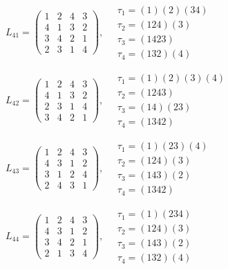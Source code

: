 $L_{41} = \begin{pmatrix} 1 & 2 & 4 & 3 \\ 4 & 1 & 3 & 2 \\ 3 & 4 & 2 & 1 \\ 2 & 3 & 1 & 4 \end{pmatrix}, \quad \begin{matrix} \tau_{1} = (1)(2)(3 4) \\ \tau_{2} = (1 2 4)(3) \\ \tau_{3} = (1 4 2 3) \\ \tau_{4} = (1 3 2)(4) \end{matrix}$

$L_{42} = \begin{pmatrix} 1 & 2 & 4 & 3 \\ 4 & 1 & 3 & 2 \\ 2 & 3 & 1 & 4 \\ 3 & 4 & 2 & 1 \end{pmatrix}, \quad \begin{matrix} \tau_{1} = (1)(2)(3)(4) \\ \tau_{2} = (1 2 4 3) \\ \tau_{3} = (1 4)(2 3) \\ \tau_{4} = (1 3 4 2) \end{matrix}$

$L_{43} = \begin{pmatrix} 1 & 2 & 4 & 3 \\ 4 & 3 & 1 & 2 \\ 3 & 1 & 2 & 4 \\ 2 & 4 & 3 & 1 \end{pmatrix}, \quad \begin{matrix} \tau_{1} = (1)(2 3)(4) \\ \tau_{2} = (1 2 4)(3) \\ \tau_{3} = (1 4 3)(2) \\ \tau_{4} = (1 3 4 2) \end{matrix}$

$L_{44} = \begin{pmatrix} 1 & 2 & 4 & 3 \\ 4 & 3 & 1 & 2 \\ 3 & 4 & 2 & 1 \\ 2 & 1 & 3 & 4 \end{pmatrix}, \quad \begin{matrix} \tau_{1} = (1)(2 3 4) \\ \tau_{2} = (1 2 4)(3) \\ \tau_{3} = (1 4 3)(2) \\ \tau_{4} = (1 3 2)(4) \end{matrix}$

